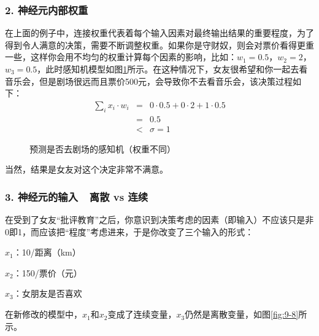 \vspace{-1em}
\subsubsection{2. 神经元内部权重}

\parinterval 在上面的例子中，连接权重代表着每个输入因素对最终输出结果的重要程度，为了得到令人满意的决策，需要不断调整权重。如果你是守财奴，则会对票价看得更重一些，这样你会用不均匀的权重计算每个因素的影响，比如：$ w_1=0.5 $，$ w_2=2 $，$ w_3=0.5 $，此时感知机模型如图\ref{fig:9-7}所示。在这种情况下，女友很希望和你一起去看音乐会，但是剧场很远而且票价500元，会导致你不去看音乐会，该决策过程如下：
\begin{eqnarray}
\sum_{i}{x_i\cdot w_i} & = & 0\cdot 0.5+0\cdot 2+1\cdot 0.5 \nonumber \\
                                   & = & 0.5 \nonumber \\
                                   & < & \sigma = 1
\label{eq:9-21}
\end{eqnarray}

\begin{figure}[htp]
\centering

\caption{预测是否去剧场的感知机（权重不同）}
\label{fig:9-7}
\end{figure}

\parinterval 当然，结果是女友对这个决定非常不满意。


\subsubsection{3. 神经元的输入\ \dash \ 离散 vs 连续}

\parinterval 在受到了女友“批评教育”之后，你意识到决策考虑的因素（即输入）不应该只是非0即1，而应该把“程度”考虑进来，于是你改变了三个输入的形式：

\parinterval $ x_1 $：10/距离（km）

\parinterval $ x_2 $：150/票价（元）

\parinterval $ x_3 $：女朋友是否喜欢

\parinterval 在新修改的模型中，$ x_1 $和$ x_2 $变成了连续变量，$ x_3 $仍然是离散变量，如图\ref{fig:9-8}所示。

